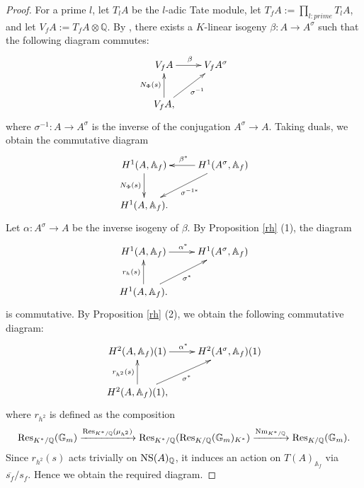 \documentclass[reqno,a4paper,11pt]{amsart}
\theoremstyle{definition}
\theoremstyle{definition}
\begin{document}
      \begin{proof} For a prime $l$, let $T_{l}A$ be the $l$-adic Tate module,  let $T_{f}A:=\prod_{l: prime}T_{l}A$, and let $V_{f}A:=T_{f}A\otimes\mathbb{Q}$.
          By \cite[Theorem 11.2]{milne2}, there exists a $K$-linear isogeny $\beta:  A\to A^{\sigma}$ such that the following diagram commutes: \begin{align}\xymatrix{ V_{f}A\ar[r]^{\beta}&V_{f}A^{\sigma}\\ V_{f}A, \ar[ru]_{\sigma^{-1}}\ar[u]^{N_{\Phi}(s)}&}\notag 
          \end{align} where $\sigma^{-1}: A\to A^{\sigma}$ is the inverse of the conjugation $A^{\sigma}\to A$.  Taking  duals, we obtain the commutative diagram
          \[\xymatrix{H^{1}(A, \mathbb{A}_{f})\ar[d]_{N_{\Phi}(s)}& H^{1}(A^{\sigma}, \mathbb{A}_{f})\ar[l]_{\beta^{\ast}}\ar[dl]^{\sigma^{-1\ast}}\\ H^{1}(A, \mathbb{A}_{f}).&}\]Let $\alpha: A^{\sigma}\to A$ be the inverse isogeny of $\beta$. By Proposition \ref{rh} (1), the diagram 
           \[\xymatrix{H^{1}(A, \mathbb{A}_{f})\ar[r]^{\alpha^{\ast}}& H^{1}(A^{\sigma}, \mathbb{A}_{f})\\ H^{1}(A, \mathbb{A}_{f}).\ar[u]^{r_{h}(s)}\ar[ru]_{\sigma^{\ast}}&}\]
           is commutative. 
         By Proposition \ref{rh} (2),  we obtain the following commutative diagram:
          \begin{align}
              \xymatrix{H^{2}(A, \mathbb{A}_{f})(1) \ar[r]^{\alpha^{\ast}}& H^{2}(A^{\sigma}, \mathbb{A}_{f})(1)\\ H^{2}(A, \mathbb{A}_{f})(1),\ar[u]^{r_{h^{2}}(s)}\ar[ru]_{\sigma^{\ast}}&} \notag 
          \end{align}
          where $r_{h^{2}}$ is defined as the composition
          \begin{align}
               {\rm Res}_{K^{\ast}/\mathbb{Q}}(\mathbb{G}_{m})\xrightarrow{{\rm Res}_{K^{\ast}/\mathbb{Q}}(\mu_{h^{2}})}{\rm Res}_{K^{\ast}/\mathbb{Q}}({\rm Res}_{K/\mathbb{Q}}(\mathbb{G}_{m})_{K^{\ast}})\xrightarrow{{\rm Nm}_{K^{\ast}/\mathbb{Q}}}{\rm Res}_{K/\mathbb{Q}}(\mathbb{G}_{m}). \notag
          \end{align}
          Since $r_{h^{2}}(s)$ acts trivially on ${\rm NS}(A)_{\mathbb{Q}}$, it induces an  action on $T(A)_{\mathbb{A}_{f}}$ via $\overline{s_{f}}/s_{f}$. Hence we obtain the required diagram. 
      \end{proof}
\end{document}
